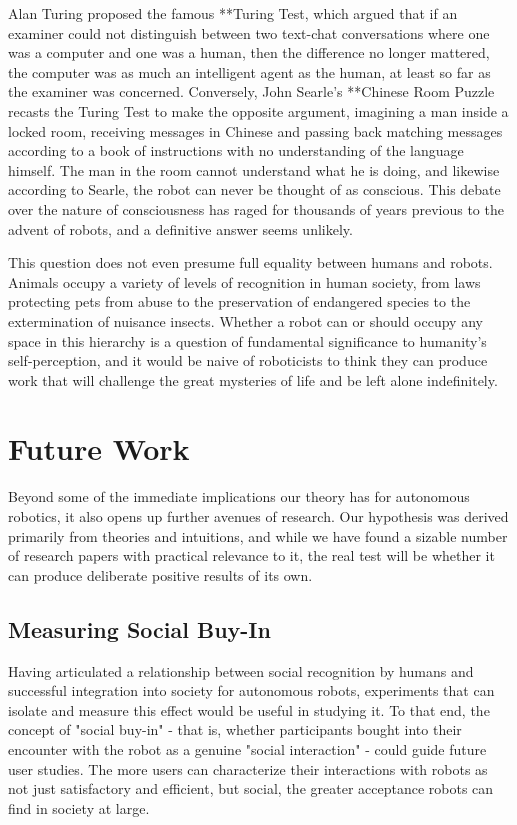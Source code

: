 \documentclass{sfuthesis}
\begin{document}
Alan Turing proposed the famous **Turing Test, which argued that if an examiner could not distinguish between two text-chat conversations where one was a computer and one was a human, then the difference no longer mattered, the computer was as much an intelligent agent as the human, at least so far as the examiner was concerned. Conversely, John Searle's **Chinese Room Puzzle recasts the Turing Test to make the opposite argument, imagining a man inside a locked room, receiving messages in Chinese and passing back matching messages according to a book of instructions with no understanding of the language himself. The man in the room cannot understand what he is doing, and likewise according to Searle, the robot can never be thought of as conscious. This debate over the nature of consciousness has raged for thousands of years previous to the advent of robots, and a definitive answer seems unlikely.

This question does not even presume full equality between humans and robots. Animals occupy a variety of levels of recognition in human society, from laws protecting pets from abuse to the preservation of endangered species to the extermination of nuisance insects. Whether a robot can or should occupy any space in this hierarchy is a question of fundamental significance to humanity's self-perception, and it would be naive of roboticists to think they can produce work that will challenge the great mysteries of life and be left alone indefinitely.

\section{Future Work}

Beyond some of the immediate implications our theory has for autonomous robotics, it also opens up further avenues of research. Our hypothesis was derived primarily from theories and intuitions, and while we have found a sizable number of research papers with practical relevance to it, the real test will be whether it can produce deliberate positive results of its own.

\subsection{Measuring Social Buy-In}

Having articulated a relationship between social recognition by humans and successful integration into society for autonomous robots, experiments that can isolate and measure this effect would be useful in studying it. To that end, the concept of "social buy-in" - that is, whether participants bought into their encounter with the robot as a genuine "social interaction" - could guide future user studies. The more users can characterize their interactions with robots as not just satisfactory and efficient, but social, the greater acceptance robots can find in society at large.
\end{document}
